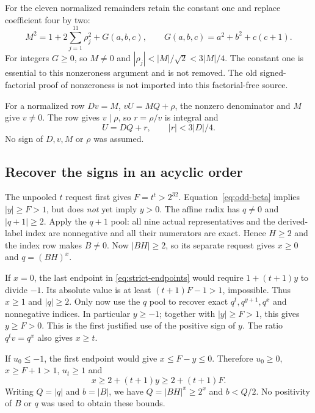 For the eleven normalized remainders retain the constant one and replace
coefficient four by two:
\begin{equation}\label{eq:strict-sphere}
 M^2=1+2\sum_{j=1}^{11}\rho_j^2+G(a,b,c),
 \qquad G(a,b,c)=a^2+b^2+c(c+1).
\end{equation}
For integers $G\ge0$, so $M\ne0$ and
$|\rho_j|<|M|/\sqrt2<3|M|/4$.
The constant one is essential to this nonzeroness argument and is not
removed. The old signed-factorial proof of nonzeroness is not imported
into this factorial-free source.

For a normalized row $Dv=M$, $vU=MQ+\rho$, the nonzero denominator
and $M$ give $v\ne0$. The row gives $v\mid\rho$, so $r=\rho/v$
is integral and
\begin{equation}\label{eq:strict-remainder}
 U=DQ+r,\qquad |r|<3|D|/4.
\end{equation}
No sign of $D,v,M$ or $\rho$ was assumed.

\subsection{Recover the signs in an acyclic order}
The unpooled $t$ request first gives $F=t^t>2^{32}$.
Equation~\eqref{eq:odd-beta} implies $|y|\ge F>1$, but does
\emph{not} yet imply $y>0$. The affine radix has $q\ne0$ and
$|q+1|\ge2$. Apply the $q+1$ pool: all nine actual representatives
and the derived-label index are nonnegative and all their numerators
are exact. Hence $H\ge2$ and the index row makes $B\ne0$.
Now $|BH|\ge2$, so its separate request gives $x\ge0$ and
$q=(BH)^x$.

If $x=0$, the last endpoint in \eqref{eq:strict-endpoints} would
require $1+(t+1)y$ to divide $-1$. Its absolute value is at least
$(t+1)F-1>1$, impossible. Thus $x\ge1$ and $|q|\ge2$.
Only now use the $q$ pool to recover exact $q^t,q^{y+1},q^x$
and nonnegative indices. In particular $y\ge-1$; together with
$|y|\ge F>1$, this gives $y\ge F>0$. This is the first justified
use of the positive sign of $y$. The ratio $q^tv=q^x$ also gives
$x\ge t$.

If $u_0\le-1$, the first endpoint would give $x\le F-y\le0$.
Therefore $u_0\ge0$, $x\ge F+1>1$, $u_t\ge1$ and
\begin{equation}\label{eq:strict-growth}
 x\ge2+(t+1)y\ge2+(t+1)F.
\end{equation}
Writing $Q=|q|$ and $b=|B|$, we have
$Q=|BH|^x\ge2^x$ and $b<Q/2$.
No positivity of $B$ or $q$ was used to obtain these bounds.


